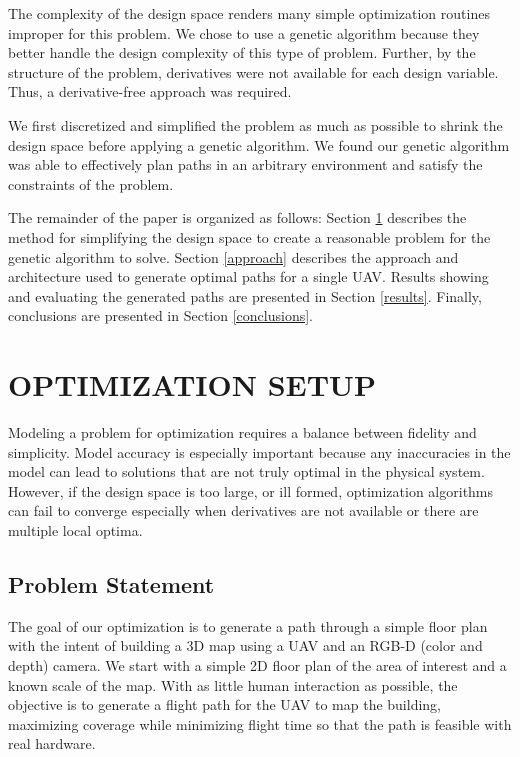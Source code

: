 \documentclass[letterpaper, 10 pt, conference]{ieeeconf}  %
\begin{document}
The complexity of the design space renders many simple optimization routines improper for this problem. We chose to use a genetic algorithm because they better handle the design complexity of this type of problem. Further, by the structure of the problem, derivatives were not available for each design variable. Thus, a derivative-free approach was required.

We first discretized and simplified the problem as much as possible to shrink the design space before applying a genetic algorithm. We found our genetic algorithm was able to effectively plan paths in an arbitrary environment and satisfy the constraints of the problem.

The remainder of the paper is organized as follows: Section \ref{setup} describes the method for simplifying the design space to create a reasonable problem for the genetic algorithm to solve. Section \ref{approach} describes the approach and architecture used to generate optimal paths for a single UAV.
Results showing and evaluating the generated paths are presented in Section \ref{results}. Finally, conclusions are presented in Section \ref{conclusions}.

\section{OPTIMIZATION SETUP}\label{setup}


Modeling a problem for optimization requires a balance between fidelity and simplicity. Model accuracy is especially important because any inaccuracies in the model can lead to solutions that are not truly optimal in the physical system. However, if the design space is too large, or ill formed, optimization algorithms can fail to converge especially when derivatives are not available or there are multiple local optima.

\subsection{Problem Statement}

The goal of our optimization is to generate a path through a simple floor plan with the intent of building a 3D map using a UAV and an RGB-D (color and depth) camera. We start with a simple 2D floor plan of the area of interest and a known scale of the map. With as little human interaction as possible, the objective is to generate a flight path for the UAV to map the building, maximizing coverage while minimizing flight time so that the path is feasible with real hardware.
\end{document}
